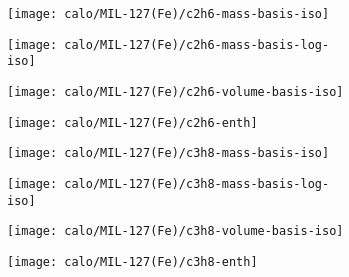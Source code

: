 \begin{figure}[H]

    \begin{subfigure}{0.25\textwidth}
        \texttt{[image: calo/MIL-127(Fe)/c2h6-mass-basis-iso]}%
        \label{appx:fgr:shaping:mil127c2h6mass}
    \end{subfigure}%
    \begin{subfigure}{0.25\textwidth}
        \texttt{[image: calo/MIL-127(Fe)/c2h6-mass-basis-log-iso]}%
        \label{appx:fgr:shaping:mil127c2h6masslog}
    \end{subfigure}%
    \begin{subfigure}{0.25\textwidth}
        \texttt{[image: calo/MIL-127(Fe)/c2h6-volume-basis-iso]}%
        \label{appx:fgr:shaping:mil127c2h6volume}
    \end{subfigure}%
    \begin{subfigure}{0.25\textwidth}
        \texttt{[image: calo/MIL-127(Fe)/c2h6-enth]}%
        \label{appx:fgr:shaping:mil127c2h6enth}
    \end{subfigure}%

    \begin{subfigure}{0.25\textwidth}
        \texttt{[image: calo/MIL-127(Fe)/c3h8-mass-basis-iso]}%
        \label{appx:fgr:shaping:mil127c3h8mass}
    \end{subfigure}%
    \begin{subfigure}{0.25\textwidth}
        \texttt{[image: calo/MIL-127(Fe)/c3h8-mass-basis-log-iso]}%
        \label{appx:fgr:shaping:mil127c3h8masslog}
    \end{subfigure}%
    \begin{subfigure}{0.25\textwidth}
        \texttt{[image: calo/MIL-127(Fe)/c3h8-volume-basis-iso]}%
        \label{appx:fgr:shaping:mil127c3h8volume}
    \end{subfigure}%
    \begin{subfigure}{0.25\textwidth}
        \texttt{[image: calo/MIL-127(Fe)/c3h8-enth]}%
        \label{appx:fgr:shaping:mil127c3h8enth}
    \end{subfigure}%


\end{figure}
